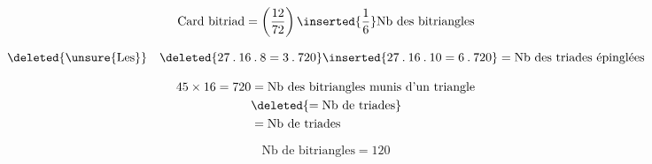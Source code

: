  

  
\[
\text{Card bitriad}=\left(\frac{12}{72}\right)\inserted{\frac16}\text{Nb des bitriangles}
\]

\[
\deleted{\unsure{\mathrm{Les}}}\quad\deleted{27\mathbin{.}16\mathbin{.}8=3\mathbin{.}720}
\inserted{27\mathbin{.}16\mathbin{.}10=6\mathbin{.}720}=\text{Nb des triades épinglées}
\]


\[
\begin{aligned}
45\times16=720&=\text{Nb des bitriangles munis d'un triangle}\\
&\deleted{=\text{Nb de triades}}\\
&=\text{Nb de triades}
\end{aligned}
\]

\[
\text{Nb de bitriangles}=120
\]


